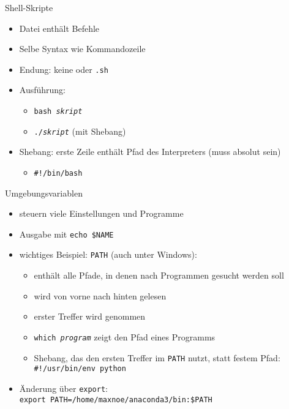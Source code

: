 \begin{frame}{Shell-Skripte}
  \begin{itemize}
    \item Datei enthält Befehle
    \item Selbe Syntax wie Kommandozeile
    \item Endung: keine oder \texttt{.sh}
    \item Ausführung:
      \begin{itemize}
        \item \texttt{bash \textit{skript}}
        \item \texttt{./\textit{skript}} (mit Shebang)
      \end{itemize}
    \item Shebang: erste Zeile enthält Pfad des Interpreters (muss absolut sein)
      \begin{itemize}
        \item \texttt{\#!/bin/bash}
      \end{itemize}
  \end{itemize}
\end{frame}

\begin{frame}{Umgebungsvariablen}
  \begin{itemize}
    \item steuern viele Einstellungen und Programme
    \item Ausgabe mit \texttt{echo \$NAME}
    \item wichtiges Beispiel: \texttt{PATH} (auch unter Windows):
      \begin{itemize}
        \item enthält alle Pfade, in denen nach Programmen gesucht werden soll
        \item wird von vorne nach hinten gelesen
        \item erster Treffer wird genommen
        \item \texttt{which \textit{program}} zeigt den Pfad eines Programms
        \item Shebang, das den ersten Treffer im \texttt{PATH} nutzt, statt festem Pfad: \texttt{\#!/usr/bin/env python}
      \end{itemize}
    \item Änderung über \texttt{export}:\\
      \texttt{export PATH=/home/maxnoe/anaconda3/bin:\$PATH}
  \end{itemize} 
\end{frame}
